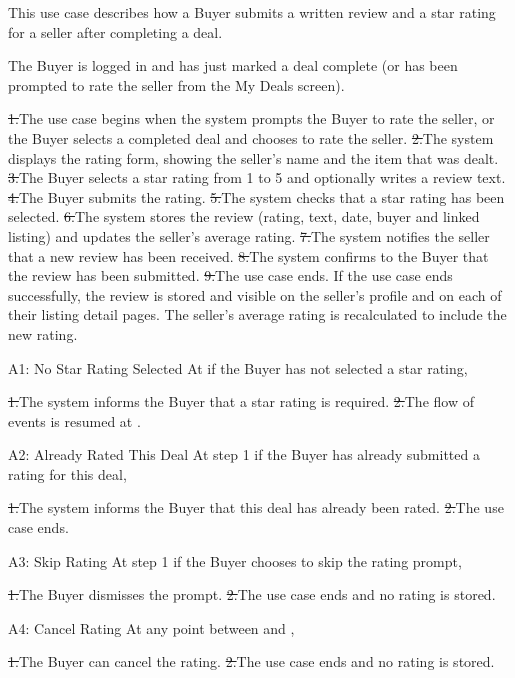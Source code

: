 This use case describes how a Buyer submits a written review and a star rating for a seller after completing a deal.\par
{}
The Buyer is logged in and has just marked a deal complete (or has been prompted to rate the seller from the My Deals screen).\par
{}
\st{1.}{The use case begins when the system prompts the Buyer to rate the seller, or the Buyer selects a completed deal and chooses to rate the seller.}
\st{2.}{The system displays the rating form, showing the seller's name and the item that was dealt.}
\st{3.}{The Buyer selects a star rating from 1 to 5 and optionally writes a review text.}
\st{4.}{The Buyer submits the rating.}
\st{5.}{The system checks that a star rating has been selected.}
\st{6.}{The system stores the review (rating, text, date, buyer and linked listing) and updates the seller's average rating.}
\st{7.}{The system notifies the seller that a new review has been received.}
\st{8.}{The system confirms to the Buyer that the review has been submitted.}
\st{9.}{The use case ends.}
If the use case ends successfully, the review is stored and visible on the seller's profile and on each of their listing detail pages. The seller's average rating is recalculated to include the new rating.\par
{}
\begin{flowblock}{A1: No Star Rating Selected}
At  if the Buyer has not selected a star rating,\par
\st{1.}{The system informs the Buyer that a star rating is required.}
\st{2.}{The flow of events is resumed at .}
\end{flowblock}
\begin{flowblock}{A2: Already Rated This Deal}
At step 1 if the Buyer has already submitted a rating for this deal,\par
\st{1.}{The system informs the Buyer that this deal has already been rated.}
\st{2.}{The use case ends.}
\end{flowblock}
\begin{flowblock}{A3: Skip Rating}
At step 1 if the Buyer chooses to skip the rating prompt,\par
\st{1.}{The Buyer dismisses the prompt.}
\st{2.}{The use case ends and no rating is stored.}
\end{flowblock}
\begin{flowblock}{A4: Cancel Rating}
At any point between  and ,\par
\st{1.}{The Buyer can cancel the rating.}
\st{2.}{The use case ends and no rating is stored.}
\end{flowblock}
